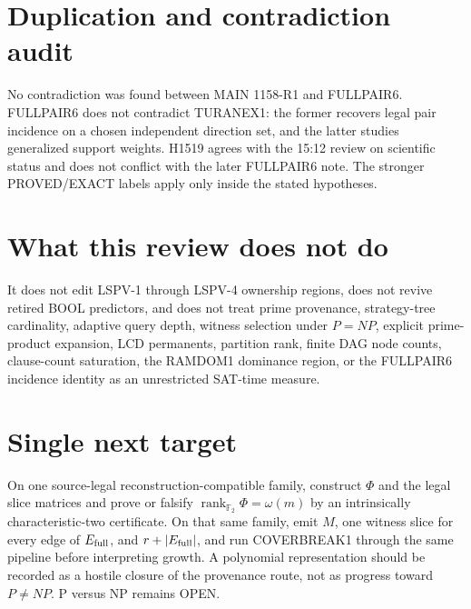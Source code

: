 \documentclass[11pt]{article}
\begin{document}
\section*{Duplication and contradiction audit}
No contradiction was found between MAIN 1158-R1 and FULLPAIR6. FULLPAIR6 does not
contradict TURANEX1: the former recovers legal pair incidence on a chosen independent
direction set, and the latter studies generalized support weights. H1519 agrees with the
15:12 review on scientific status and does not conflict with the later FULLPAIR6 note.
The stronger PROVED/EXACT labels apply only inside the stated hypotheses.

\section*{What this review does not do}
It does not edit LSPV-1 through LSPV-4 ownership regions, does not revive retired BOOL
predictors, and does not treat prime provenance, strategy-tree cardinality, adaptive query
depth, witness selection under \(P=NP\), explicit prime-product expansion, LCD permanents,
partition rank, finite DAG node counts, clause-count saturation, the RAMDOM1 dominance
region, or the FULLPAIR6 incidence identity as an unrestricted SAT-time measure.

\section*{Single next target}
On one source-legal reconstruction-compatible family, construct \(\Phi\) and the legal slice
matrices and prove or falsify \(\operatorname{rank}_{\mathbb F_2}\Phi=\omega(m)\) by an
intrinsically characteristic-two certificate. On that same family, emit \(M\), one witness
slice for every edge of \(E_{\rm full}\), and \(r+|E_{\rm full}|\), and run COVERBREAK1
through the same pipeline before interpreting growth. A polynomial representation should be
recorded as a hostile closure of the provenance route, not as progress toward \(P\neq NP\).
P versus NP remains OPEN.

\end{document}
